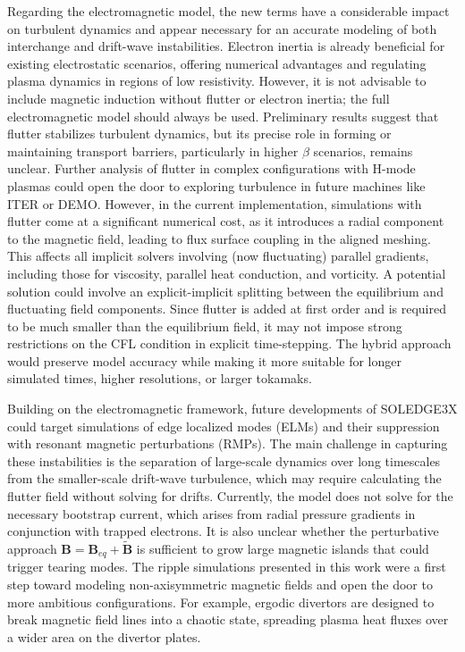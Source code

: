 Regarding the electromagnetic model, the new terms have a considerable impact on turbulent dynamics and appear necessary for an accurate modeling of both interchange and drift-wave instabilities. Electron inertia is already beneficial for existing electrostatic scenarios, offering numerical advantages and regulating plasma dynamics in regions of low resistivity. However, it is not advisable to include magnetic induction without flutter or electron inertia; the full electromagnetic model should always be used. Preliminary results suggest that flutter stabilizes turbulent dynamics, but its precise role in forming or maintaining transport barriers, particularly in higher $\beta$ scenarios, remains unclear. Further analysis of flutter in complex configurations with H-mode plasmas could open the door to exploring turbulence in future machines like ITER or DEMO. However, in the current implementation, simulations with flutter come at a significant numerical cost, as it introduces a radial component to the magnetic field, leading to flux surface coupling in the aligned meshing. This affects all implicit solvers involving (now fluctuating) parallel gradients, including those for viscosity, parallel heat conduction, and vorticity. A potential solution could involve an explicit-implicit splitting between the equilibrium and fluctuating field components. Since flutter is added at first order and is required to be much smaller than the equilibrium field, it may not impose strong restrictions on the CFL condition in explicit time-stepping. The hybrid approach would preserve model accuracy while making it more suitable for longer simulated times, higher resolutions, or larger tokamaks.

Building on the electromagnetic framework, future developments of SOLEDGE3X could target simulations of edge localized modes (ELMs) and their suppression with resonant magnetic perturbations (RMPs). The main challenge in capturing these instabilities is the separation of large-scale dynamics over long timescales from the smaller-scale drift-wave turbulence, which may require calculating the flutter field without solving for drifts. Currently, the model does not solve for the necessary bootstrap current, which arises from radial pressure gradients in conjunction with trapped electrons. It is also unclear whether the perturbative approach $\mathbf{B} = \mathbf{B}_{eq} + \tilde{\mathbf{B}}$ is sufficient to grow large magnetic islands that could trigger tearing modes. The ripple simulations presented in this work were a first step toward modeling non-axisymmetric magnetic fields and open the door to more ambitious configurations. For example, ergodic divertors are designed to break magnetic field lines into a chaotic state, spreading plasma heat fluxes over a wider area on the divertor plates.







